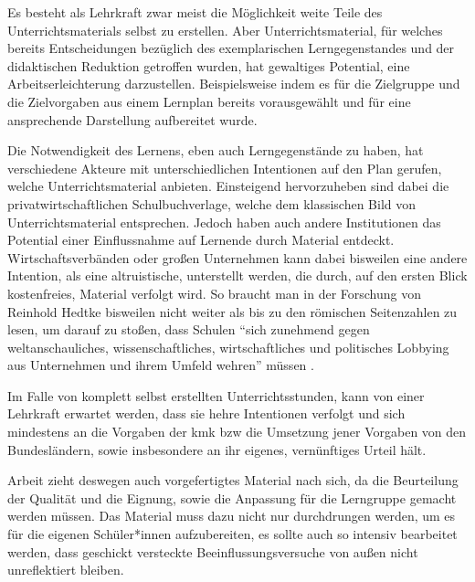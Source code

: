 Es besteht als Lehrkraft zwar meist die Möglichkeit weite Teile des Unterrichtsmaterials selbst zu erstellen.
Aber Unterrichtsmaterial, für welches bereits Entscheidungen bezüglich des exemplarischen Lerngegenstandes und der didaktischen Reduktion getroffen wurden, hat gewaltiges Potential, eine Arbeitserleichterung darzustellen.
Beispielsweise indem es für die Zielgruppe und die Zielvorgaben aus einem Lernplan bereits vorausgewählt und für eine ansprechende Darstellung aufbereitet wurde. 
\bigskip

Die Notwendigkeit des Lernens, eben auch Lerngegenstände zu haben, hat verschiedene Akteure mit unterschiedlichen Intentionen auf den Plan gerufen, welche Unterrichtsmaterial anbieten. 
Einsteigend hervorzuheben sind dabei die privatwirtschaftlichen Schulbuchverlage, welche dem klassischen Bild von Unterrichtsmaterial entsprechen. Jedoch haben auch andere Institutionen das Potential einer Einflussnahme auf Lernende durch 
Material entdeckt. Wirtschaftsverbänden oder großen Unternehmen kann dabei bisweilen eine andere Intention, als eine altruistische, unterstellt werden, die durch, auf den ersten Blick kostenfreies, Material verfolgt wird. So braucht man in der Forschung von Reinhold Hedtke bisweilen nicht weiter als bis zu den römischen Seitenzahlen zu lesen, um darauf zu stoßen, dass Schulen \enquote{sich zunehmend gegen weltanschauliches, wissenschaftliches, wirtschaftliches und politisches Lobbying aus Unternehmen und ihrem Umfeld wehren} müssen \autocite[i]{Hedtke2016}. 

Im Falle von komplett selbst erstellten Unterrichtsstunden, kann von einer Lehrkraft erwartet werden, dass sie hehre Intentionen verfolgt und sich mindestens an die Vorgaben der \gls{kmk} \gls{bzw} die Umsetzung jener Vorgaben von den Bundesländern, sowie insbesondere an ihr eigenes, vernünftiges Urteil hält. 

Arbeit zieht deswegen auch vorgefertigtes Material nach sich, da die Beurteilung der Qualität und die Eignung, sowie die Anpassung für die Lerngruppe gemacht werden müssen. Das Material muss dazu nicht nur durchdrungen werden, um es für die eigenen Schüler*innen aufzubereiten, es sollte auch so intensiv bearbeitet werden, dass geschickt versteckte Beeinflussungsversuche von außen nicht unreflektiert bleiben. 






